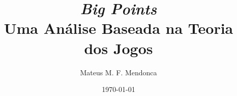 \documentclass[dvipdfm, a4paper, 11pt]{article}
\begin{document}
\title{\textit{Big Points}\\Uma Análise Baseada na Teoria dos Jogos}
\author{Mateus M. F. Mendonca}
\date{\today}
\maketitle
\end{document}
